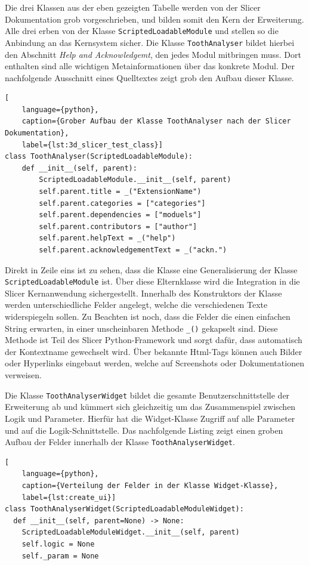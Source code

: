 Die drei Klassen aus der eben gezeigten Tabelle werden von der Slicer Dokumentation
grob vorgeschrieben, und bilden somit den Kern der Erweiterung. Alle drei erben von
der Klasse \texttt{ScriptedLoadableModule} und stellen so die Anbindung an das
Kernsystem sicher. Die Klasse \texttt{ToothAnalyser} bildet hierbei den
Abschnitt \textit{Help and Acknowledgemt}, den jedes Modul mitbringen muss. Dort
enthalten sind alle wichtigen Metainformationen über das konkrete Modul. Der
nachfolgende Ausschnitt eines Quelltextes zeigt grob den Aufbau dieser Klasse.

\begin{lstlisting}[
    language={python},
    caption={Grober Aufbau der Klasse ToothAnalyser nach der Slicer Dokumentation},
    label={lst:3d_slicer_test_class}]
class ToothAnalyser(ScriptedLoadableModule):
    def __init__(self, parent):
	    ScriptedLoadableModule.__init__(self, parent)
	    self.parent.title = _("ExtensionName")
	    self.parent.categories = ["categories"]
	    self.parent.dependencies = ["moduels"]
	    self.parent.contributors = ["author"]
	    self.parent.helpText = _("help")
	    self.parent.acknowledgementText = _("ackn.")
\end{lstlisting}

Direkt in Zeile eins ist zu sehen, dass die Klasse eine Generalisierung der
Klasse \texttt{ScriptedLoadableModule} ist. Über diese Elternklasse wird die
Integration in die Slicer Kernanwendung sichergestellt. Innerhalb des Konstruktors
der Klasse werden unterschiedliche Felder angelegt, welche die verschiedenen
Texte widerspiegeln sollen. Zu Beachten ist noch, dass die Felder die einen
einfachen String erwarten, in einer unscheinbaren Methode \texttt{\_()}
gekapselt sind. Diese Methode ist Teil des Slicer Python-Framework und sorgt dafür,
dass automatisch der Kontextname gewechselt wird. Über bekannte Html-Tags können
auch Bilder oder Hyperlinks eingebaut werden, welche auf Screenshots oder
Dokumentationen verweisen.

Die Klasse \texttt{ToothAnalyserWidget} bildet die gesamte Benutzerschnittstelle
der Erweiterung ab und kümmert sich gleichzeitig um das Zusammenspiel zwischen Logik
und Parameter. Hierfür hat die Widget-Klasse Zugriff auf alle Parameter und auf
die Logik-Schnittstelle. Das nachfolgende Listing zeigt einen groben Aufbau der Felder
innerhalb der Klasse \texttt{ToothAnalyserWidget}.

\begin{lstlisting}[
    language={python},
    caption={Verteilung der Felder in der Klasse Widget-Klasse},
    label={lst:create_ui}]
class ToothAnalyserWidget(ScriptedLoadableModuleWidget):
  def __init__(self, parent=None) -> None:
    ScriptedLoadableModuleWidget.__init__(self, parent)
    self.logic = None
    self._param = None
\end{lstlisting}


